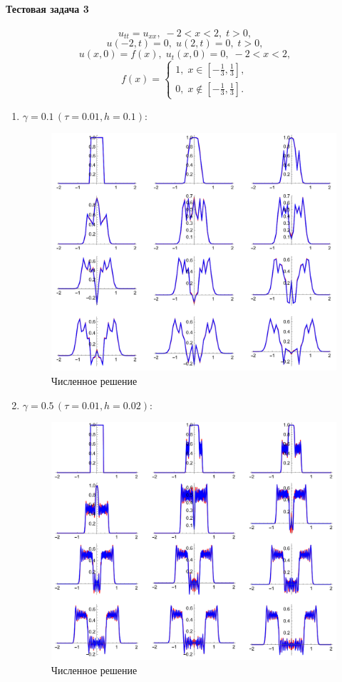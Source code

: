 \documentclass[12pt, a4paper]{article}
\begin{document}
	\paragraph{Тестовая задача 3}
\[
u_{tt}=u_{xx},\;-2<x<2,\;t>0,
\]
\[
u(-2,t)=0,\;u(2,t)=0,\;t>0,
\]
\[
u(x,0)=f(x),\; u_t(x,0)=0,\;-2<x<2,
\]
\[
f(x)=
\begin{cases}
	1,\;x\in[-\frac13,\frac13],\\
	0,\;x\notin[-\frac13,\frac13].
\end{cases}
\]
\begin{enumerate}
\item $\gamma =0.1\,(\tau = 0.01 ,h =0.1)$:
\begin{figure}[H]
	\centering
	\includegraphics[width=0.7\linewidth]{task1_0.1}
	\caption{Численное решение}
\end{figure}
\newpage
\item $\gamma =0.5\,(\tau = 0.01 ,h =0.02)$:
\begin{figure}[H]
	\centering
	\includegraphics[width=0.7\linewidth]{task1_0.5}
	\caption{Численное решение}
\end{figure}

\end{enumerate}
\end{document}
